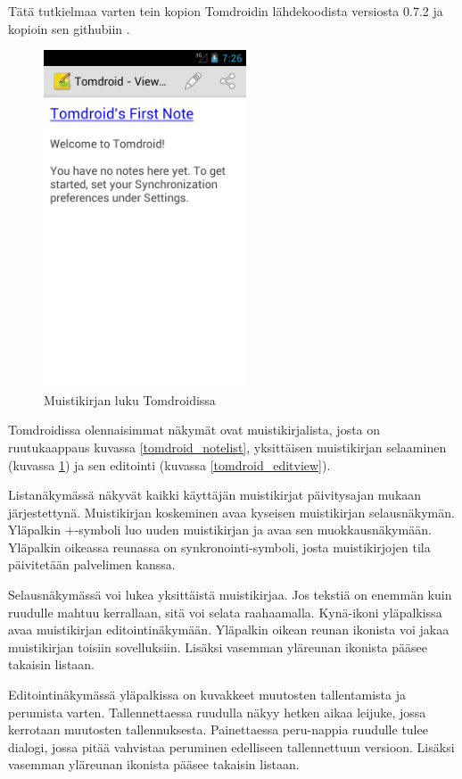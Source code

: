Tätä tutkielmaa varten tein kopion Tomdroidin lähdekoodista versiosta 0.7.2 ja kopioin sen githubiin \cite{tomdroid_github}.

\begin{figure}[htb]
\includegraphics[width=60mm]{tomdroid_noteview.png}
\caption{Muistikirjan luku Tomdroidissa} \label{tomdroid_noteview}
\end{figure}

Tomdroidissa olennaisimmat näkymät ovat muistikirjalista, josta on ruutukaappaus kuvassa \ref{tomdroid_notelist}, yksittäisen muistikirjan selaaminen (kuvassa \ref{tomdroid_noteview}) ja sen editointi (kuvassa \ref{tomdroid_editview}). 

Listanäkymässä näkyvät kaikki käyttäjän muistikirjat päivitysajan mukaan järjestettynä. Muistikirjan koskeminen avaa kyseisen muistikirjan selausnäkymän. Yläpalkin +-symboli luo uuden muistikirjan ja avaa sen muokkausnäkymään. Yläpalkin oikeassa reunassa on synkronointi-symboli, josta muistikirjojen tila päivitetään palvelimen kanssa.

Selausnäkymässä voi lukea yksittäistä muistikirjaa. Jos tekstiä on enemmän kuin ruudulle mahtuu kerrallaan, sitä voi selata raahaamalla. Kynä-ikoni yläpalkissa avaa muistikirjan editointinäkymään. Yläpalkin oikean reunan ikonista voi jakaa muistikirjan toisiin sovelluksiin. Lisäksi vasemman yläreunan ikonista pääsee takaisin listaan.

Editointinäkymässä yläpalkissa on kuvakkeet muutosten tallentamista ja perumista varten. Tallennettaessa ruudulla näkyy hetken aikaa leijuke, jossa kerrotaan muutosten tallennuksesta. Painettaessa peru-nappia ruudulle tulee dialogi, jossa pitää vahvistaa peruminen edelliseen tallennettuun versioon. Lisäksi vasemman yläreunan ikonista pääsee takaisin listaan.

